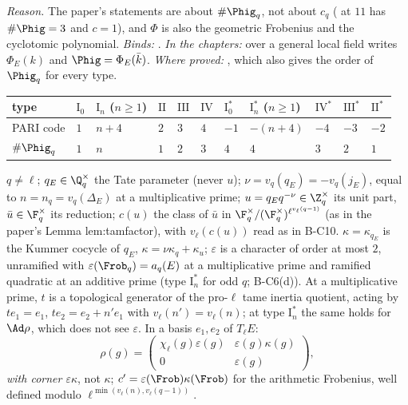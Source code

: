 \noindent\emph{Reason.} The paper's statements are about $\#\Phig_q$, not about $c_q$ ( at $11$ has $\#\Phig=3$ and
$c=1$), and $\Phi$ is also the geometric Frobenius and the cyclotomic polynomial. \emph{Binds:} .
\emph{In the chapters:} over a general local field  writes $\Phi_E(k)$ and $\Phig=\Phi_E(\bar k)$.
\emph{Where proved:} , which also gives the order of $\Phig_q$ for every type.

\begin{center}\small
\begin{tabular}{@{}lllllllllll@{}}
\toprule
type & $\mathrm I_0$ & $\mathrm I_n$ ($n\ge1$) & $\mathrm{II}$ & $\mathrm{III}$ & $\mathrm{IV}$ & $\mathrm I_0^*$ & $\mathrm I_n^*$ ($n\ge1$) & $\mathrm{IV}^*$ & $\mathrm{III}^*$ & $\mathrm{II}^*$\\
\midrule
PARI code & $1$ & $n+4$ & $2$ & $3$ & $4$ & $-1$ & $-(n+4)$ & $-4$ & $-3$ & $-2$\\
$\#\Phig_q$ & $1$ & $n$ & $1$ & $2$ & $3$ & $4$ & $4$ & $3$ & $2$ & $1$\\
\bottomrule
\end{tabular}
\end{center}

\begin{convention}\label{conv:notation:bc14}
$q\ne\ell$; $q_E\in\Q_q^\times$ the Tate parameter (never $u$); $\nu=v_q(q_E)=-v_q(j_E)$, equal to $n=n_q=v_q(\Delta_E)$ at a
multiplicative prime; $u=q_Eq^{-\nu}\in\Z_q^\times$ its unit part, $\bar u\in\F_q^\times$ its reduction; $c(u)$ the class of $\bar u$ in
$\F_q^\times/(\F_q^\times)^{\ell^{v_\ell(q-1)}}$ (as in the paper's Lemma lem:tamfactor), with $v_\ell(c(u))$ read as in B-C10.
$\kappa=\kappa_{q_E}$ is the Kummer cocycle of $q_E$, $\kappa=\nu\kappa_q+\kappa_u$; $\varepsilon$ is a character of order at most $2$, unramified with
$\varepsilon(\Frob_q)=a_q(E)$ at a multiplicative prime and ramified quadratic at an additive prime (type $\mathrm I_n^*$ for odd $q$; B-C6(d)). At
a multiplicative prime, $t$ is a topological generator of the pro-$\ell$ tame inertia quotient, acting by $te_1=e_1$, $te_2=e_2+n'e_1$ with
$v_\ell(n')=v_\ell(n)$; at type $\mathrm I_n^*$ the same holds for $\Ad\rho$, which does not see $\varepsilon$. In a basis $e_1,e_2$ of $T_\ell E$:
\[
\rho(g)=\begin{pmatrix}\chi_\ell(g)\varepsilon(g)&\varepsilon(g)\kappa(g)\\0&\varepsilon(g)\end{pmatrix},
\]
\emph{with corner $\varepsilon\kappa$}, not $\kappa$; $c'=\varepsilon(\Frob)\kappa(\Frob)$ for the arithmetic Frobenius, well defined modulo
$\ell^{\min(v_\ell(n),v_\ell(q-1))}$.
\end{convention}

